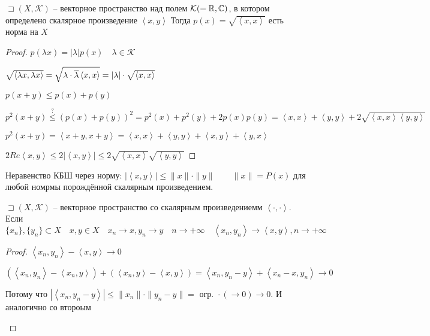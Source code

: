 \begin{statement}
    $\sqsupset (X, \mathcal{K})$ -- векторное пространство над полем $\mathcal{K}( = \mathbb{R}, \mathbb{C})$, в котором определено скалярное произведение $ \left< x, y \right>$ Тогда $p(x) = \sqrt{\left< x, x \right>} $ есть норма на $X$
\end{statement}
\begin{proof}
    $p(\lambda x) = |\lambda|p(x)\quad \lambda \in \mathcal{K}$

    $\sqrt{\left< \lambda x, \lambda x \right>} = \sqrt{\lambda \cdot  \overline{\lambda} \left< x, x \right>}  = |\lambda| \cdot \sqrt{\left< x, x \right>} $

    $p(x+y)\leqslant p(x) + p(y)$

    $p^2(x+y) \overset ? {\leqslant } (p(x) + p(y))^2 = p^2(x) + p^2(y) + 2p(x)p(y) = \left< x, x \right> + \left< y, y \right> + 2\sqrt{\left< x, x \right> \left< y, y \right>} $

    $p^2(x+y) = \left< x+y, x+y \right> = \left< x, x \right> + \left< y, y \right> + \left< x, y  \right> + \left< y, x \right>$

    $2 Re\left<x, y \right> \leqslant 2 \left| \left< x,y \right> \right| \leqslant 2\sqrt{\left< x, x \right>} \sqrt{\left< y, y \right>} $
\end{proof}

Неравенство КБШ через норму: $\left| \left< x, y \right> \right| \leqslant \|x\| \cdot \|y\|\qquad \|x\| = P(x)$ для любой номрмы порождённой скалярным произведением.

\begin{statement}
    $\sqsupset \left( X, \mathcal{K} \right) $ -- векторное пространство со скалярным произведениемм $\left<\cdot , \cdot  \right>.$ Если  $\{x_{n} \}, \{y_{n} \} \subset X\quad x, y\in X\quad x_{n} \to x, y_{n} \to y\quad n \to  +\infty \quad \left<x_{n} , y_{n}  \right> \to \left< x, y \right>, n\to  +\infty $
\end{statement}
\begin{proof}
    $\left< x_{n} , y_{n}  \right> - \left< x, y \right> \to 0$

    $\left( \left<x_{n} , y_{n}  \right> - \left<x_{n} , y \right> \right)  + \left( \left< x_{n} , y \right> - \left< x, y \right> \right)  = \left< x_{n} , y_{n} -y \right> + \left< x_{n} -x, y_{n}  \right> \to 0$

    Потому что $\left| \left< x_{n} , y_{n} -y \right> \right| \leqslant \|x_{n} \|\cdot \|y_{n} -y\| =  \text{ огр. } \cdot  (\to 0) \to 0$. И аналогично со второым

    $$
\end{proof}

